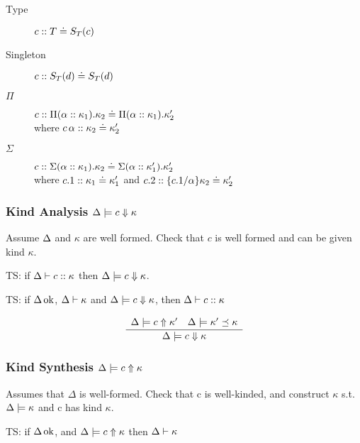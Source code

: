 \documentclass[12pt,twoside,fleqn]{amsart}
\theoremstyle{plain}
\theoremstyle{plain}
\theoremstyle{definition}
\begin{document}
\begin{description}
\item [Type]\( c ::T \doteq S_{T}(c ) \)
\item [Singleton]\( c ::S_{T}(d ) \doteq S_{T}(d ) \)
\item [\( \Pi  \)]\( c ::\Pi (\alpha ::\kappa _{1}).\kappa _{2} \doteq \Pi (\alpha ::\kappa _{1}).\kappa _{2}' \)
\\
where \( c\, \alpha  ::\kappa _{2} \doteq \kappa _{2}' \)
\item [\( \Sigma  \)]\( c ::\Sigma (\alpha ::\kappa _{1}).\kappa _{2} \doteq \Sigma (\alpha ::\kappa _{1}').\kappa _{2}' \)
\\
where \( c.1 ::\kappa _{1} \doteq \kappa _{1}' \) and \( c.2 ::\{c.1 /\alpha  \}\kappa _{2} \doteq \kappa _{2}' \)
\end{description}

\subsubsection{Kind Analysis \protect\( \Delta  \models c \Downarrow \kappa \protect \)}

Assume \( \Delta  \) and \( \kappa  \) are well formed. Check that \( c \)
is well formed and can be given kind \( \kappa  \).

TS: if \( \Delta  \vdash c  ::\kappa   \) then \( \Delta  \models c \Downarrow \kappa  \).

TS: if \( \Delta  \, \mathrm{ok} \), \( \Delta  \vdash \kappa   \) and \( \Delta  \models c \Downarrow \kappa  \),
then \( \Delta  \vdash c  ::\kappa   \)


\[
\frac{\begin{array}{ll}
\Delta  \models c \Uparrow \kappa ' & \Delta  \models \kappa ' \preceq \kappa 
\end{array} }{\Delta  \models c \Downarrow \kappa  }\]



\subsubsection{Kind Synthesis \protect\( \Delta  \models c \Uparrow \kappa \protect \)}

Assumes that \( \Delta  \) is well-formed. Check that c is well-kinded, and
construct \( \kappa  \) s.t. \( \Delta  \models \kappa  \) and c has
kind \( \kappa  \). 

TS: if \( \Delta  \, \mathrm{ok} \), and \( \Delta  \models c \Uparrow \kappa  \)
then \( \Delta  \vdash \kappa   \)
\end{document}
